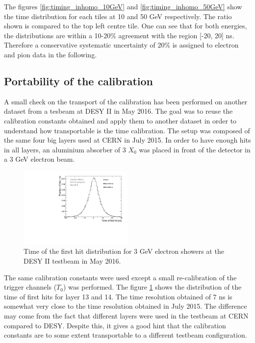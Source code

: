 The figures \ref{fig:timing_inhomo_10GeV} and \ref{fig:timing_inhomo_50GeV} show the time distribution for each tiles at 10 and 50 GeV respectively. The ratio shown is compared to the top left centre tile. One can see that for both energies, the distributions are within a 10-20\% agreement with the region [-20, 20] ns. Therefore a conservative systematic uncertainty of 20\% is assigned to electron and pion data in the following.

\subsection{Portability of the calibration}

A small check on the transport of the calibration has been performed on another dataset from a tesbeam at DESY II in May 2016. The goal was to reuse the calibration constants obtained and apply them to another dataset in order to understand how transportable is the time calibration. The setup was composed of the same four big layers used at CERN in July 2015. In order to have enough hits in all layers, an aluminium absorber of 3 $X_{0}$ was placed in front of the detector in a 3 GeV electron beam.

\begin{figure}[htbp!]
	\centering
	\includegraphics[width=0.5\textwidth]{chap5/fig_AHCAL_timing/Electrons/Timing_May2016_BigLayers.pdf}
	\caption{Time of the first hit distribution for 3 GeV electron showers at the DESY II testbeam in May 2016.}\label{fig:TBMay2016}
\end{figure}

The same calibration constants were used except a small re-calibration of the trigger channels ($T_{0}$) was performed. The figure \ref{fig:TBMay2016} shows the distribution of the time of first hits for layer 13 and 14. The time resolution obtained of 7 ns is somewhat very close to the time resolution obtained in July 2015. The difference may come from the fact that different layers were used in the testbeam at CERN compared to DESY. Despite this, it gives a good hint that the calibration constants are to some extent transportable to a different testbeam configuration.

